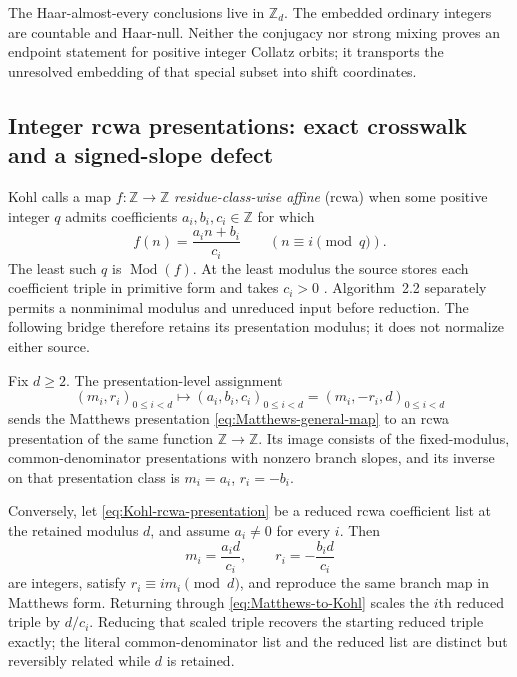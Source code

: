 \begin{nonclaim}
The Haar-almost-every conclusions live in $\mathbb Z_d$.  The embedded ordinary
integers are countable and Haar-null.  Neither the conjugacy nor strong mixing
proves an endpoint statement for positive integer Collatz orbits; it transports
the unresolved embedding of that special subset into shift coordinates.
\end{nonclaim}

\subsection{Integer rcwa presentations: exact crosswalk and a signed-slope defect}

Kohl calls a map $f:\mathbb Z\to\mathbb Z$ \emph{residue-class-wise affine}
(rcwa) when some positive integer $q$ admits coefficients
$a_i,b_i,c_i\in\mathbb Z$ for which
\begin{equation}
\label{eq:Kohl-rcwa-presentation}
 f(n)=\frac{a_i n+b_i}{c_i}
 \qquad(n\equiv i\pmod q).
\end{equation}
The least such $q$ is $\operatorname{Mod}(f)$.  At the least modulus the source
stores each coefficient triple in primitive form and takes $c_i>0$
\cite[Defs.~1.1 and 2.1]{Kohl2008}.  Algorithm~2.2 separately permits a
nonminimal modulus and unreduced input before reduction.  The following bridge
therefore retains its presentation modulus; it does not normalize either source.

\begin{proposition}
\label{prop:Matthews-Kohl-crosswalk}
Fix $d\geq2$.  The presentation-level assignment
\begin{equation}
\label{eq:Matthews-to-Kohl}
 (m_i,r_i)_{0\leq i<d}
 \longmapsto
 (a_i,b_i,c_i)_{0\leq i<d}
 =(m_i,-r_i,d)_{0\leq i<d}
\end{equation}
sends the Matthews presentation \eqref{eq:Matthews-general-map} to an rcwa
presentation of the same function $\mathbb Z\to\mathbb Z$.  Its image consists
of the fixed-modulus, common-denominator presentations with nonzero branch
slopes, and its inverse on that presentation class is
$m_i=a_i$, $r_i=-b_i$.

Conversely, let \eqref{eq:Kohl-rcwa-presentation} be a reduced rcwa coefficient
list at the retained modulus $d$, and assume $a_i\neq0$ for every $i$.  Then
\begin{equation}
\label{eq:Kohl-to-Matthews}
 m_i=\frac{a_i d}{c_i},
 \qquad
 r_i=-\frac{b_i d}{c_i}
\end{equation}
are integers, satisfy $r_i\equiv i m_i\pmod d$, and reproduce the same branch
map in Matthews form.  Returning through \eqref{eq:Matthews-to-Kohl} scales the
$i$th reduced triple by $d/c_i$.  Reducing that scaled triple recovers the
starting reduced triple exactly; the literal common-denominator list and the
reduced list are distinct but reversibly related while $d$ is retained.
\end{proposition}

